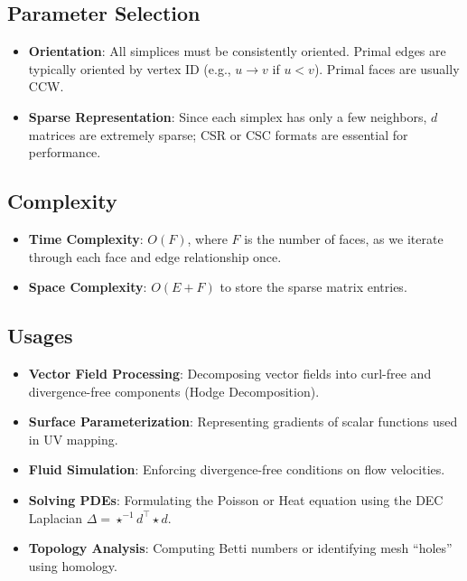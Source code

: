 \subsection{Parameter Selection}
\begin{itemize}
    \item \textbf{Orientation}: All simplices must be consistently oriented. Primal edges are typically oriented by vertex ID (e.g., $u \to v$ if $u < v$). Primal faces are usually CCW.
    \item \textbf{Sparse Representation}: Since each simplex has only a few neighbors, $d$ matrices are extremely sparse; CSR or CSC formats are essential for performance.
\end{itemize}

\subsection{Complexity}
\begin{itemize}
    \item \textbf{Time Complexity}: $O(F)$, where $F$ is the number of faces, as we iterate through each face and edge relationship once.
    \item \textbf{Space Complexity}: $O(E + F)$ to store the sparse matrix entries.
\end{itemize}

\subsection{Usages}
\begin{itemize}
    \item \textbf{Vector Field Processing}: Decomposing vector fields into curl-free and divergence-free components (Hodge Decomposition).
    \item \textbf{Surface Parameterization}: Representing gradients of scalar functions used in UV mapping.
    \item \textbf{Fluid Simulation}: Enforcing divergence-free conditions on flow velocities.
    \item \textbf{Solving PDEs}: Formulating the Poisson or Heat equation using the DEC Laplacian $\Delta = \star^{-1} d^\top \star d$.
    \item \textbf{Topology Analysis}: Computing Betti numbers or identifying mesh ``holes'' using homology.
\end{itemize}

